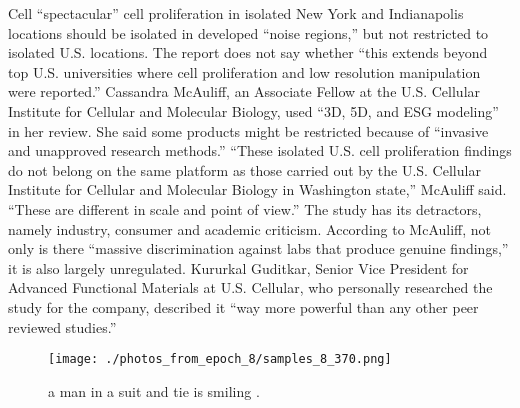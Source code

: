 \documentclass{article}%
\begin{document}
Cell “spectacular” cell proliferation in isolated New York and Indianapolis locations should be isolated in developed “noise regions,” but not restricted to isolated U.S. locations.\newline%
The report does not say whether “this extends beyond top U.S. universities where cell proliferation and low resolution manipulation were reported.”\newline%
Cassandra McAuliff, an Associate Fellow at the U.S. Cellular Institute for Cellular and Molecular Biology, used “3D, 5D, and ESG modeling” in her review. She said some products might be restricted because of “invasive and unapproved research methods.”\newline%
“These isolated U.S. cell proliferation findings do not belong on the same platform as those carried out by the U.S. Cellular Institute for Cellular and Molecular Biology in Washington state,” McAuliff said.\newline%
“These are different in scale and point of view.”\newline%
The study has its detractors, namely industry, consumer and academic criticism. According to McAuliff, not only is there “massive discrimination against labs that produce genuine findings,” it is also largely unregulated.\newline%
Kururkal Guditkar, Senior Vice President for Advanced Functional Materials at U.S. Cellular, who personally researched the study for the company, described it “way more powerful than any other peer reviewed studies.”\newline%

%


\begin{figure}[h!]%
\centering%
\texttt{[image: ./photos\_from\_epoch\_8/samples\_8\_370.png]}%
\caption{a man in a suit and tie is smiling .}%
\end{figure}

%
\end{document}
